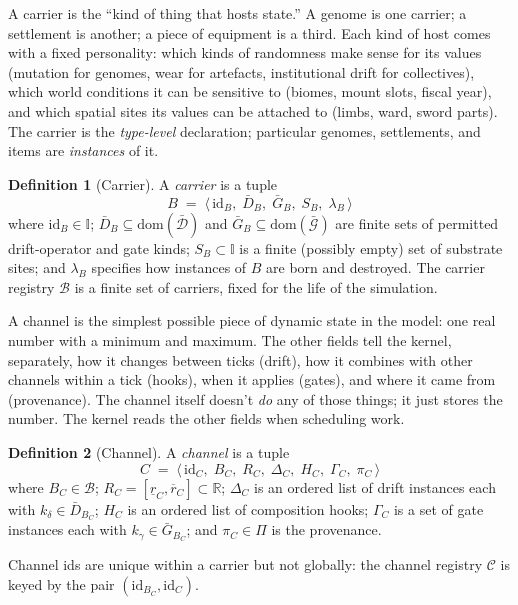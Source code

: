 \documentclass[journal,onecolumn,11pt]{IEEEtran}
\theoremstyle{definition}
\newtheorem{definition}{Definition}
\begin{document}
A carrier is the ``kind of thing that hosts state.'' A genome is one carrier; a settlement is another; a piece of equipment is a third. Each kind of host comes with a fixed personality: which kinds of randomness make sense for its values (mutation for genomes, wear for artefacts, institutional drift for collectives), which world conditions it can be sensitive to (biomes, mount slots, fiscal year), and which spatial sites its values can be attached to (limbs, ward, sword parts). The carrier is the \emph{type-level} declaration; particular genomes, settlements, and items are \emph{instances} of it.

\begin{definition}[Carrier]\label{def:carrier}
A \emph{carrier} is a tuple
\[
B \;=\; \langle\, \mathrm{id}_B,\; \bar{D}_B,\; \bar{G}_B,\; S_B,\; \lambda_B \,\rangle
\]
where $\mathrm{id}_B \in \mathbb{I}$; $\bar{D}_B \subseteq \mathrm{dom}(\bar{\mathcal{D}})$ and $\bar{G}_B \subseteq \mathrm{dom}(\bar{\mathcal{G}})$ are finite sets of permitted drift-operator and gate kinds; $S_B \subset \mathbb{I}$ is a finite (possibly empty) set of substrate sites; and $\lambda_B$ specifies how instances of $B$ are born and destroyed. The carrier registry $\mathcal{B}$ is a finite set of carriers, fixed for the life of the simulation.
\end{definition}

A channel is the simplest possible piece of dynamic state in the model: one real number with a minimum and maximum. The other fields tell the kernel, separately, how it changes between ticks (drift), how it combines with other channels within a tick (hooks), when it applies (gates), and where it came from (provenance). The channel itself doesn't \emph{do} any of those things; it just stores the number. The kernel reads the other fields when scheduling work.

\begin{definition}[Channel]\label{def:channel}
A \emph{channel} is a tuple
\[
C \;=\; \langle\, \mathrm{id}_C,\; B_C,\; R_C,\; \Delta_C,\; H_C,\; \Gamma_C,\; \pi_C \,\rangle
\]
where $B_C \in \mathcal{B}$; $R_C = [\underline{r}_C, \overline{r}_C] \subset \mathbb{R}$; $\Delta_C$ is an ordered list of drift instances each with $k_\delta \in \bar{D}_{B_C}$; $H_C$ is an ordered list of composition hooks; $\Gamma_C$ is a set of gate instances each with $k_\gamma \in \bar{G}_{B_C}$; and $\pi_C \in \Pi$ is the provenance.
\end{definition}

Channel ids are unique within a carrier but not globally: the channel registry $\mathcal{C}$ is keyed by the pair $(\mathrm{id}_{B_C}, \mathrm{id}_C)$.
\end{document}
